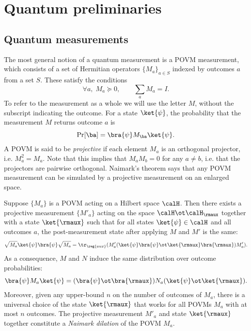 \section{Quantum preliminaries}  \label{sec:prelims}
\subsection{Quantum measurements}
The most general notion of a quantum measurement is a POVM
measurement, which consists of a set of Hermitian operators $\{M_a\}_{a \in S}$
indexed by outcomes $a$ from a set $S$. These satisfy the
conditions
\[ \forall a,\; M_a \succeq 0, \qquad \sum_a M_a = I. \]
To refer to the measurement as a whole
we will use the letter $M$, without the subscript indicating the
outcome. For a state $\ket{\psi}$, the
probability that the measurement $M$ returns outcome $a$ is
\[ \Pr[\ba] = \bra{\psi} M_{\ba} \ket{\psi}. \]
A POVM is said to be \emph{projective} if each element $M_a$ is an
orthogonal projector, i.e. $M_a^2 = M_a$. Note that this implies that
$M_a M_b = 0$ for any $a \neq b$, i.e. that the projectors are
pairwise orthogonal. Naimark's theorem says that any POVM measurement
can be simulated by a projective measurement on an enlarged space.
\begin{theorem}[Naimark]\label{thm:naimark}
  Suppose $\{M_a\}$ is a POVM acting on a Hilbert space $\calH$. Then
  there exists a projective measurement $\{M'_a\}$ acting on the space
  $\calH \ot \calH_{\rmaux}$ together with a state $\ket{\rmaux}$ such
  that for all states $\ket{\psi} \in \calH$ and all outcomes $a$, the
  post-measurement state after applying $M$ and $M'$ is the same:
  \begin{equation} \sqrt{M_a} \ket{\psi}\bra{\psi} \sqrt{M_a} = \tr_{\reg{aux}}(M'_a (\ket{\psi}\bra{\psi}
    \ot \ket{\rmaux}\bra{\rmaux})M'_a). \label{eq:naimark}\end{equation}
  As a consequence, $M$ and $N$ induce the same distribution over
  outcome probabilities:
  \[ \bra{\psi} M_a \ket{\psi} = (\bra{\psi} \ot \bra{\rmaux}) N_a
    (\ket{\psi} \ot \ket{\rmaux}). \]
  Moreover, given any upper-bound $n$ on the number of outcomes of
  $M_a$, there is a universal choice of the state $\ket{\rmaux}$ that
  works for all POVMs $M_a$ with at most $n$ outcomes. The projective measurement
  $M'_a$ and state $\ket{\rmaux}$ together constitute a \emph{Naimark
    dilation} of the POVM $M_a$.
\end{theorem}

